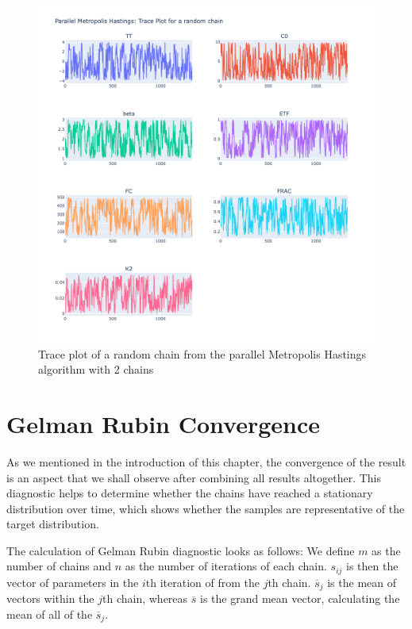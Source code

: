 \begin{figure}[H]
    \centering
    \includegraphics[width=1\textwidth]{figures/parallel_mh/tp_rand_2.png}
    \captionsetup{width=.8\textwidth}
    \caption{Trace plot of a random chain from the parallel Metropolis Hastings algorithm with 2 chains}
    \label{fig:enter-label}
\end{figure}


\section{Gelman Rubin Convergence}
As we mentioned in the introduction of this chapter, the convergence of the result is an aspect that we shall observe after combining all results altogether. This diagnostic helps to determine whether the chains have reached a stationary distribution over time, which shows whether the samples are representative of the target distribution.\cite{gelman_rubin}

The calculation of Gelman Rubin diagnostic looks as follows: We define $m$ as the number of chains and $n$ as the number of iterations of each chain. $s_{ij}$ is then the vector of parameters in the $i$th iteration of from the $j$th chain. $\overline{s}_j$ is the mean of vectors within the $j$th chain, whereas $\overline{s}$ is the grand mean vector, calculating the mean of all of the $\overline{s}_j$.\cite{gr_calc}

